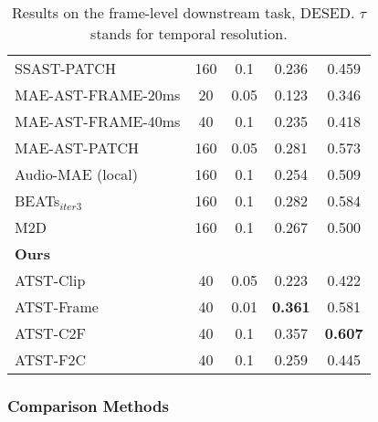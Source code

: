 \begin{table}[h]
{\begin{threeparttable}
\begin{tabular}{lcccc}
        SSAST-PATCH     \cite{gong_ssast_2022}       & 160 & 0.1 & 0.236 & 0.459 \\
        MAE-AST-FRAME-20ms \cite{baade_mae-ast_2022} & 20 & 0.05 & 0.123 & 0.346 \\
        MAE-AST-FRAME-40ms \cite{baade_mae-ast_2022} & 40 & 0.1 & 0.235 & 0.418 \\
        MAE-AST-PATCH   \cite{baade_mae-ast_2022}    & 160 & 0.05 & 0.281 & 0.573 \\
        Audio-MAE (local) \cite{huang_masked_2023}   & 160 & 0.1 & 0.254 & 0.509 \\
        BEATs$_{iter3}$ \cite{chen_beats_2022}       & 160 & 0.1 & 0.282 & 0.584 \\
        M2D \cite{niizumi_masked_2023}               & 160 & 0.1 & 0.267 & 0.500 \\
        \midrule
        \multicolumn{5}{l}{\textbf{Ours}} \\
        ATST-Clip                          & 40 & 0.05 & 0.223 & 0.422      \\
        ATST-Frame                         & 40 & 0.01 & \textbf{0.361} & 0.581 \\
        ATST-C2F                         & 40 & 0.1 & 0.357 & \textbf{0.607}  \\
        \textcolor{mygray}{ATST-F2C}                         & \textcolor{mygray}{40} & \textcolor{mygray}{0.1} & \textcolor{mygray}{0.259} & \textcolor{mygray}{0.445} \\
        \bottomrule
        \end{tabular}     
    \end{threeparttable}
  }
  \caption{Results on the frame-level downstream task, DESED.  {$\tau$} stands for temporal resolution.}
  \label{tab:linear_SED}
\end{table}










\subsubsection{Comparison Methods}

